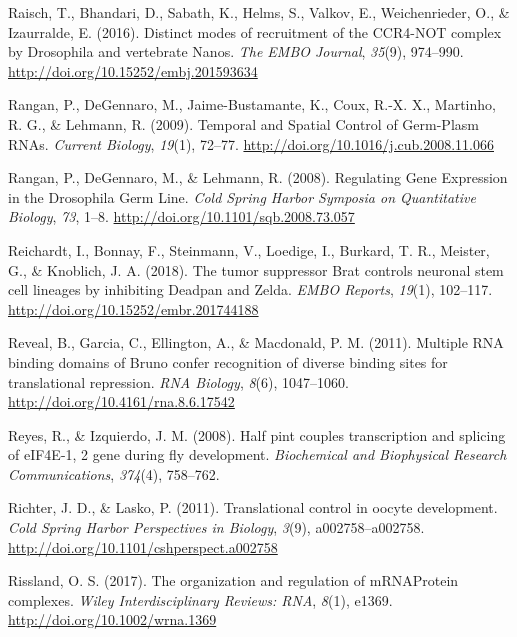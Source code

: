 \documentclass[12pt,twoside]{reedthesis}
\newlength{\cslhangindent}
\newenvironment{cslreferences}%
  {\setlength{\parindent}{0pt}%
  \everypar{\setlength{\hangindent}{\cslhangindent}}\ignorespaces}%
  {\par}
\begin{document}
\begin{cslreferences}
\leavevmode\hypertarget{ref-Raisch2016h}{}%
Raisch, T., Bhandari, D., Sabath, K., Helms, S., Valkov, E., Weichenrieder, O., \& Izaurralde, E. (2016). Distinct modes of recruitment of the CCR4-NOT complex by Drosophila and vertebrate Nanos. \emph{The EMBO Journal}, \emph{35}(9), 974--990. \url{http://doi.org/10.15252/embj.201593634}

\leavevmode\hypertarget{ref-Rangan2009}{}%
Rangan, P., DeGennaro, M., Jaime-Bustamante, K., Coux, R.-X. X., Martinho, R. G., \& Lehmann, R. (2009). Temporal and Spatial Control of Germ-Plasm RNAs. \emph{Current Biology}, \emph{19}(1), 72--77. \url{http://doi.org/10.1016/j.cub.2008.11.066}

\leavevmode\hypertarget{ref-Rangan2008}{}%
Rangan, P., DeGennaro, M., \& Lehmann, R. (2008). Regulating Gene Expression in the Drosophila Germ Line. \emph{Cold Spring Harbor Symposia on Quantitative Biology}, \emph{73}, 1--8. \url{http://doi.org/10.1101/sqb.2008.73.057}

\leavevmode\hypertarget{ref-Reichardt2018d}{}%
Reichardt, I., Bonnay, F., Steinmann, V., Loedige, I., Burkard, T. R., Meister, G., \& Knoblich, J. A. (2018). The tumor suppressor Brat controls neuronal stem cell lineages by inhibiting Deadpan and Zelda. \emph{EMBO Reports}, \emph{19}(1), 102--117. \url{http://doi.org/10.15252/embr.201744188}

\leavevmode\hypertarget{ref-Reveal2011j}{}%
Reveal, B., Garcia, C., Ellington, A., \& Macdonald, P. M. (2011). Multiple RNA binding domains of Bruno confer recognition of diverse binding sites for translational repression. \emph{RNA Biology}, \emph{8}(6), 1047--1060. \url{http://doi.org/10.4161/rna.8.6.17542}

\leavevmode\hypertarget{ref-Reyes2008}{}%
Reyes, R., \& Izquierdo, J. M. (2008). Half pint couples transcription and splicing of eIF4E-1, 2 gene during fly development. \emph{Biochemical and Biophysical Research Communications}, \emph{374}(4), 758--762.

\leavevmode\hypertarget{ref-Richter2011j}{}%
Richter, J. D., \& Lasko, P. (2011). Translational control in oocyte development. \emph{Cold Spring Harbor Perspectives in Biology}, \emph{3}(9), a002758--a002758. \url{http://doi.org/10.1101/cshperspect.a002758}

\leavevmode\hypertarget{ref-Rissland2017k}{}%
Rissland, O. S. (2017). The organization and regulation of mRNAProtein complexes. \emph{Wiley Interdisciplinary Reviews: RNA}, \emph{8}(1), e1369. \url{http://doi.org/10.1002/wrna.1369}


\end{cslreferences}
\end{document}

